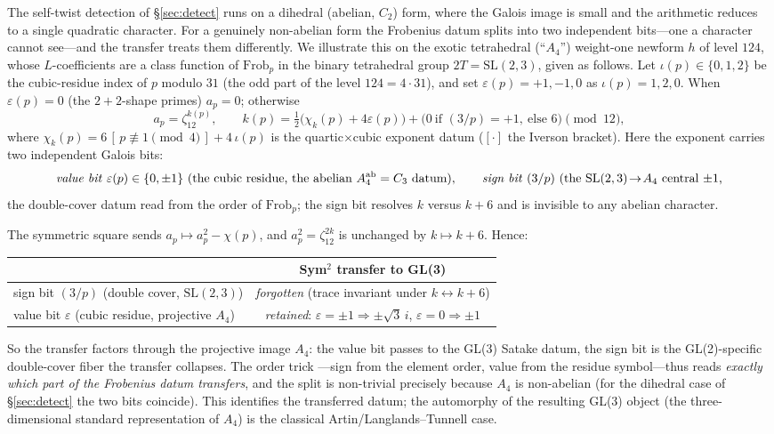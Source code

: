 \documentclass[11pt]{article}
\theoremstyle{definition}
\begin{document}
The self-twist detection of \S\ref{sec:detect} runs on a dihedral (abelian, $C_2$) form, where the
Galois image is small and the arithmetic reduces to a single quadratic character. For a genuinely
non-abelian form the Frobenius datum splits into two independent bits---one a character cannot
see---and the transfer treats them differently. We illustrate this on the exotic tetrahedral
(``$A_4$'') weight-one newform $h$ of level $124$, whose $L$-coefficients are a class function of
$\mathrm{Frob}_p$ in the binary tetrahedral group $2T=\mathrm{SL}(2,3)$, given as follows. Let $\iota(p)\in\{0,1,2\}$ be the cubic-residue index of $p$ modulo $31$ (the odd part of the
level $124=4\cdot31$), and set $\varepsilon(p)=+1,-1,0$ as $\iota(p)=1,2,0$. When $\varepsilon(p)=0$ (the
$2{+}2$-shape primes) $a_p=0$; otherwise
\[
  a_p=\zeta_{12}^{k(p)},\qquad
  k(p)=\tfrac12\big(\chi_k(p)+4\varepsilon(p)\big)+\big(0\ \text{if }(3/p)=+1,\ \text{else }6\big)\pmod{12},
\]
where $\chi_k(p)=6\,[\,p\not\equiv1\!\!\pmod 4\,]+4\,\iota(p)$ is the quartic$\times$cubic exponent datum
($[\cdot]$ the Iverson bracket). Here the exponent carries two independent Galois bits:
\[
  \text{\emph{value bit}}\ \varepsilon(p)\in\{0,\pm1\}\ \text{(the cubic residue, the abelian
  $A_4^{\mathrm{ab}}=C_3$ datum)},\qquad
  \text{\emph{sign bit}}\ (3/p)\ \text{(the $\mathrm{SL}(2,3)\!\to\!A_4$ central $\pm1$,}
\]
the double-cover datum read from the order of $\mathrm{Frob}_p$; the sign bit resolves $k$ versus
$k+6$ and is invisible to any abelian character.

The symmetric square sends $a_p\mapsto a_p^2-\chi(p)$, and $a_p^2=\zeta_{12}^{2k}$ is unchanged by
$k\mapsto k+6$. Hence:

\begin{center}
\begin{tabular}{lc}
\toprule
 & Sym$^2$ transfer to GL(3) \\
\midrule
sign bit $(3/p)$ (double cover, $\mathrm{SL}(2,3)$) & \emph{forgotten} (trace invariant under $k\!\leftrightarrow\!k{+}6$) \\
value bit $\varepsilon$ (cubic residue, projective $A_4$) & \emph{retained}: $\varepsilon=\pm1\Rightarrow\pm\sqrt3\,i$, $\varepsilon=0\Rightarrow\pm1$ \\
\bottomrule
\end{tabular}
\end{center}

So the transfer factors through the projective image $A_4$: the value bit passes to the GL(3) Satake
datum, the sign bit is the GL(2)-specific double-cover fiber the transfer collapses. The order trick
---sign from the element order, value from the residue symbol---thus reads \emph{exactly which part
of the Frobenius datum transfers}, and the split is non-trivial precisely because $A_4$ is
non-abelian (for the dihedral case of \S\ref{sec:detect} the two bits coincide). This identifies the
transferred datum; the automorphy of the resulting GL(3) object (the three-dimensional standard
representation of $A_4$) is the classical Artin/Langlands--Tunnell case.
\end{document}
